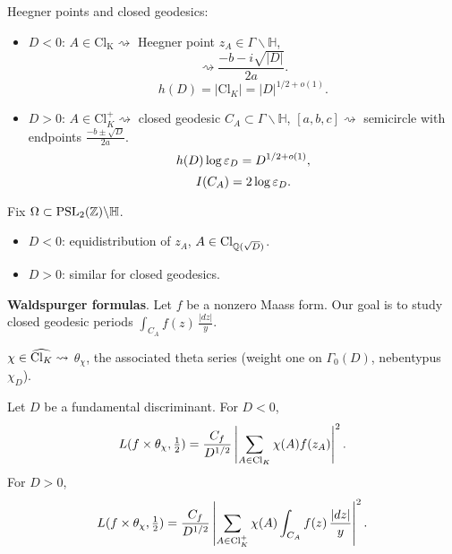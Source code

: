 \documentclass[reqno]{amsart} 
\begin{document}
Heegner points and closed geodesics:
\begin{itemize}
\item $D < 0$: $A \in \mathrm{Cl_K} \rightsquigarrow$ Heegner point $z_A \in \Gamma \backslash \mathbb{H}$,
  \begin{equation*}
    [a, b, c] \rightsquigarrow \frac{- b - i \sqrt{\lvert D \rvert}}{2 a}.
  \end{equation*}
  \begin{equation*}
    h(D) = \lvert \mathrm{Cl}_K \rvert = \lvert D \rvert^{1/2 + o(1)}.
  \end{equation*}
\item $D > 0$: $A \in \mathrm{Cl}_K^+ \rightsquigarrow $ closed geodesic $C_A \subset \Gamma \backslash \mathbb{H}$,
  $[a, b, c] \rightsquigarrow$ semicircle with endpoints $\frac{- b \pm \sqrt{D}}{2 a}$.
  \begin{equation*}
    h(D) \log \varepsilon_D = D^{1/2 + o(1)},
  \end{equation*}
  \begin{equation*}
    I(C_A) = 2 \log \varepsilon_D.
  \end{equation*}
\end{itemize}

\begin{theorem}[Duke '88]
  Fix $\Omega \subset \operatorname{PSL}_2(\mathbb{Z}) \backslash \mathbb{H}$.

  \begin{itemize}
  \item $D < 0$: equidistribution of $z_A$, $A \in \operatorname{Cl}_{\mathbb{Q}(\sqrt{D})}$.
  \item $D > 0$: similar for closed geodesics.
  \end{itemize}
\end{theorem}


\textbf{Waldspurger formulas}.  Let $f$ be a nonzero Maass form.  Our goal is to study closed geodesic periods $\int_{C_A} f(z) \, \frac{\lvert d z \rvert}{y}$.

$\chi \in \widehat{\operatorname{Cl}_K} \rightsquigarrow $ $\theta_\chi$, the associated theta series (weight one on $\Gamma_0(D)$, nebentypus $\chi_D$).

\begin{theorem}
  Let $D$ be a fundamental discriminant.  For $D < 0$,
  \begin{equation*}
    L(f \times \theta_\chi, \tfrac{1}{2})
    = \frac{C_f}{ D^{1/2}}
    \left| \sum_{A \in \operatorname{Cl}_K} \chi(A) f(z_A) \right|^2.
  \end{equation*}
  For $D > 0$,
  \begin{equation*}
    L(f \times \theta_\chi, \tfrac{1}{2}) = \frac{C_f}{ D^{1/2}}
    \left| \sum_{A \in \operatorname{Cl}_K^+} \chi(A) \int_{C_A} f(z)
      \, \frac{\lvert d z \rvert}{y}
    \right|^2.
  \end{equation*}
\end{theorem}
\end{document}
